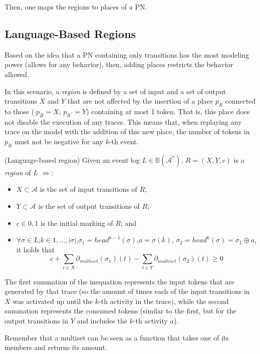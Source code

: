 \documentclass[a4paper]{report}
\begin{document}
Then, one maps the regions to places of a PN.

\subsection*{Language-Based Regions}

Based on the idea that a PN containing only transitions has the most modeling power (allows for any behavior), then, adding places restricts the behavior allowed.

In this scenario, a \emph{region} is defined by a set of input and a set of output transitions $X$ and $Y$ that are not affected by the insertion of a place $p_R$ connected to those ($\cdot p_R=X$, $p_R\cdot =Y$) containing at most 1 token. That is, this place does not disable the execution of any traces. This means that, when replaying any trace on the model with the addition of this new place, the number of tokens in $p_R$ must not be negative for any $k$-th event.

\begin{definition}
    (Language-based region) Given an event log $L\in \mathbb{B}(\mathcal{A}^{*})$, $R=(X,Y,c)$ is a \emph{region} of $L$ $\iff$:
    \begin{itemize}
	\item $X\subset \mathcal{A}$ is the set of input transitions of $R$;
	\item $Y\subset \mathcal{A}$ is the set of output transitions of $R$;
	\item $c\in {0,1}$ is the initial marking of $R$; and
	\item $\forall \sigma \in L$,$k\in {1,\ldots,|\sigma|}$,$\sigma_1=head^{k-1}(\sigma)$,$a=\sigma(k)$, $\sigma_2=head^{k}(\sigma)=\sigma_1 \oplus a$, it holds that \[
		c + \sum_{t\in X} \partial_{multiset}(\sigma_1)(t) - \sum_{t\in Y} \partial_{multiset}(\sigma_2)(t) \ge 0
	\] 
    \end{itemize}
\end{definition}

The first summation of the inequation represents the input tokens that are generated by that trace (so the amount of times each of the input transitions in $X$ was activated up until the $k$-th activity in the trace), while the second summation represents the consumed tokens (similar to the first, but for the output transitions in $Y$ and includes the $k$-th activity $a$).

\begin{note}
    Remember that a multiset can be seen as a function that takes one of its members and returns its amount.
\end{note}
\end{document}
